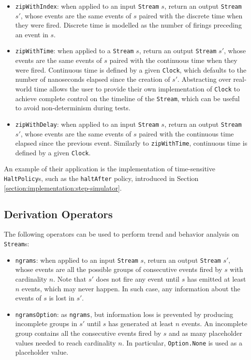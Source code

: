 \begin{itemize}
  \item \texttt{zipWithIndex}: when applied to an input \texttt{Stream} $s$,
        return an output \texttt{Stream} $s'$, whose events are the same events
        of $s$ paired with the discrete time when they were fired. Discrete
        time is modelled as the number of firings preceding an event in $s$.
  \item \texttt{zipWithTime}: when applied to a \texttt{Stream} $s$, return an
        output \texttt{Stream} $s'$, whose events are the same events of $s$
        paired with the continuous time when they were fired. Continuous time
        is defined by a given \texttt{Clock}, which defaults to the number of
        nanoseconds elapsed since the creation of $s'$. Abstracting over
        real-world time allows the user to provide their own implementation of
        \texttt{Clock} to achieve complete control on the timeline of the
        \texttt{Stream}, which can be useful to avoid non-determinism during
        tests.
  \item \texttt{zipWithDelay}: when applied to an input \texttt{Stream} $s$,
        return an output \texttt{Stream} $s'$, whose events are the same events
        of $s$ paired with the continuous time elapsed since the previous
        event. Similarly to \texttt{zipWithTime}, continuous time is defined by
        a given \texttt{Clock}.
\end{itemize}

An example of their application is the implementation of time-sensitive
\texttt{Halt\-Policy}s, such as the \texttt{haltAfter} policy, introduced in
Section \ref{section:implementation:step-simulator}.

\subsection{Derivation Operators}

The following operators can be used to perform trend and behavior analysis on
\texttt{Stream}s:

\begin{itemize}
  \item \texttt{ngrams}: when applied to an input \texttt{Stream} $s$, return
        an output \texttt{Stream} $s'$, whose events are all the possible
        groups of consecutive events fired by $s$ with cardinality $n$. Note
        that $s'$ does not fire any event until $s$ has emitted at least $n$
        events, which may never happen. In such case, any information about the
        events of $s$ is lost in $s'$.
  \item \texttt{ngramsOption}: as \texttt{ngrams}, but information loss is
        prevented by producing incomplete groups in $s'$ until $s$ has
        generated at least $n$ events. An incomplete group contains all the
        consecutive events fired by $s$ and as many placeholder values needed
        to reach cardinality $n$. In particular, \texttt{Option.None} is used
        as a placeholder value.
\end{itemize}

